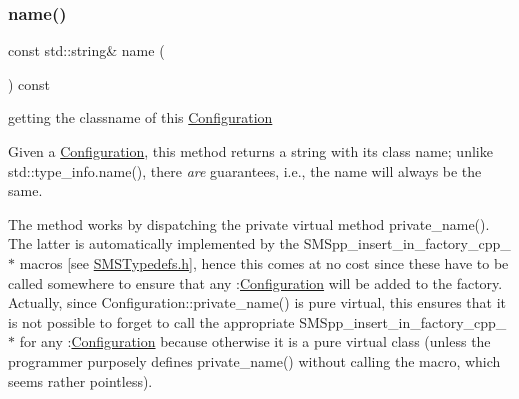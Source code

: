 \mbox{\label{class_s_m_spp__di__unipi__it_1_1_configuration_a738e9dfd6e00507da219e4bd5a3f6be9}} 
\subsubsection{\texorpdfstring{name()}{name()}}
{\footnotesize\ttfamily const std\+::string\& name (\begin{DoxyParamCaption}\item[{void}]{ }\end{DoxyParamCaption}) const\hspace{0.3cm}{\ttfamily [inline]}}



getting the classname of this \mbox{\hyperlink{class_s_m_spp__di__unipi__it_1_1_configuration}{Configuration}} 

Given a \mbox{\hyperlink{class_s_m_spp__di__unipi__it_1_1_configuration}{Configuration}}, this method returns a string with its class name; unlike std\+::type\+\_\+info.\+name(), there {\itshape are} guarantees, i.\+e., the name will always be the same.

The method works by dispatching the private virtual method private\+\_\+name(). The latter is automatically implemented by the S\+M\+Spp\+\_\+insert\+\_\+in\+\_\+factory\+\_\+cpp\+\_\+$\ast$ macros \mbox{[}see \mbox{\hyperlink{_s_m_s_typedefs_8h}{S\+M\+S\+Typedefs.\+h}}\mbox{]}, hence this comes at no cost since these have to be called somewhere to ensure that any \+:\mbox{\hyperlink{class_s_m_spp__di__unipi__it_1_1_configuration}{Configuration}} will be added to the factory. Actually, since Configuration\+::private\+\_\+name() is pure virtual, this ensures that it is not possible to forget to call the appropriate S\+M\+Spp\+\_\+insert\+\_\+in\+\_\+factory\+\_\+cpp\+\_\+$\ast$ for any \+:\mbox{\hyperlink{class_s_m_spp__di__unipi__it_1_1_configuration}{Configuration}} because otherwise it is a pure virtual class (unless the programmer purposely defines private\+\_\+name() without calling the macro, which seems rather pointless). \mbox{\label{class_s_m_spp__di__unipi__it_1_1_configuration_af321a3adfc7fcd3e0f9d21b03bdb3fae}} 
